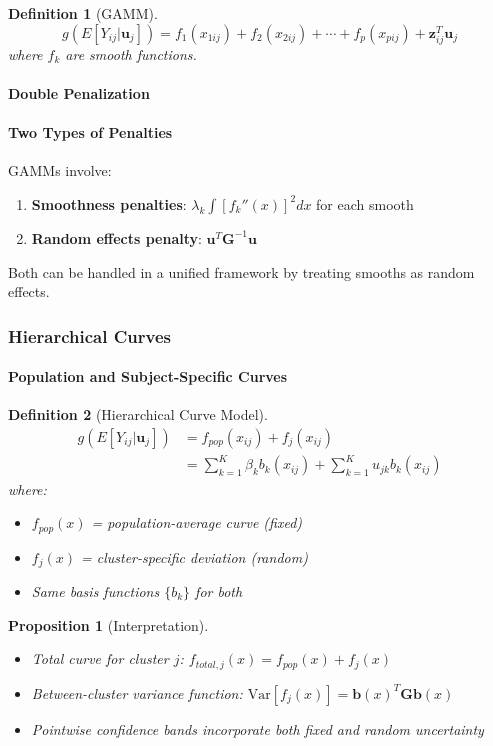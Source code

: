 \documentclass{article}
\newtheorem{definition}{Definition}
\newtheorem{proposition}{Proposition}
\begin{document}
\begin{definition}[GAMM]
\begin{equation}
g(E[Y_{ij}|\mathbf{u}_j]) = f_1(x_{1ij}) + f_2(x_{2ij}) + \cdots + f_p(x_{pij}) + \mathbf{z}_{ij}^T\mathbf{u}_j
\end{equation}
where $f_k$ are smooth functions.
\end{definition}

\paragraph{Double Penalization}

\paragraph*{Two Types of Penalties}
GAMMs involve:
\begin{enumerate}
    \item \textbf{Smoothness penalties}: $\lambda_k \int [f_k''(x)]^2dx$ for each smooth
    \item \textbf{Random effects penalty}: $\mathbf{u}^T\mathbf{G}^{-1}\mathbf{u}$
\end{enumerate}
Both can be handled in a unified framework by treating smooths as random effects.


\subsubsection{Hierarchical Curves}

\paragraph{Population and Subject-Specific Curves}

\begin{definition}[Hierarchical Curve Model]
\begin{align}
g(E[Y_{ij}|\mathbf{u}_j]) &= f_{pop}(x_{ij}) + f_j(x_{ij}) \\
&= \sum_{k=1}^K \beta_k b_k(x_{ij}) + \sum_{k=1}^K u_{jk} b_k(x_{ij}) \nonumber
\end{align}
where:
\begin{itemize}
    \item $f_{pop}(x)$ = population-average curve (fixed)
    \item $f_j(x)$ = cluster-specific deviation (random)
    \item Same basis functions $\{b_k\}$ for both
\end{itemize}
\end{definition}

\begin{proposition}[Interpretation]
\begin{itemize}
    \item Total curve for cluster $j$: $f_{total,j}(x) = f_{pop}(x) + f_j(x)$
    \item Between-cluster variance function: $\text{Var}[f_j(x)] = \mathbf{b}(x)^T\mathbf{G}\mathbf{b}(x)$
    \item Pointwise confidence bands incorporate both fixed and random uncertainty
\end{itemize}
\end{proposition}
\end{document}
